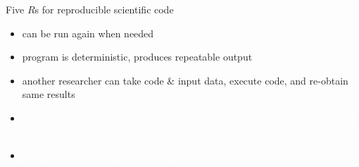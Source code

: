 

\begin{frame}{Five $R$s for reproducible scientific code}

  \small
  
  \begin{itemize}[leftmargin=2.45cm]
    \itemsep9pt
    \item<1->[$\mathbf{R^1}$ \textit{Re-runnable}:] can be run again when needed 

    \item<3->[$\mathbf{R^2}$ \textit{Repeatable}:] program is deterministic, produces repeatable output 

    \item<5->[$\mathbf{R^3}$ \textit{Reproducible}:] another researcher can take code \& input data, execute code, and re-obtain same results \\ 

          \item<1->[] \textcolor{white}{program  can be easily used, and modified, by you and other people, inside \& outside own lab \\ }

    \item<1->[] \textcolor{white}{program can be re-implemented by another research to re-obtain results  \\ }



  \end{itemize}  

  
  
  
\end{frame}


